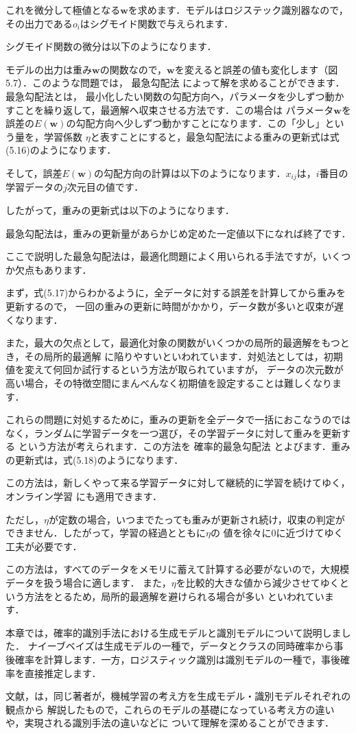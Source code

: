 これを微分して極値となる$\bm{w}$を求めます．モデルはロジステック識別器なので，その出力である$o_i$はシグモイド関数で与えられます．

シグモイド関数の微分は以下のようになります．

モデルの出力は重み$\bm{w}$の関数なので，$\bm{w}$を変えると誤差の値も変化します（図5.7）．このような問題では，
最急勾配法
によって解を求めることができます．最急勾配法とは，
最小化したい関数の勾配方向へ，パラメータを少しずつ動かすことを繰り返して，最適解へ収束させる方法です．この場合は
パラメータ$\bm{w}$を誤差の$E(\bm{w})$の勾配方向へ少しずつ動かすことになります．この「少し」という量を，学習係数
$\eta$と表すことにすると，最急勾配法による重みの更新式は式(5.16)のようになります．


そして，誤差$E(\bm{w})$の勾配方向の計算は以下のようになります．$x_{ij}$は，$i$番目の学習データの$j$次元目の値です．

したがって，重みの更新式は以下のようになります．

最急勾配法は，重みの更新量があらかじめ定めた一定値以下になれば終了です．


ここで説明した最急勾配法は，最適化問題によく用いられる手法ですが，いくつか欠点もあります．

まず，式(5.17)からわかるように，全データに対する誤差を計算してから重みを更新するので，
一回の重みの更新に時間がかかり，データ数が多いと収束が遅くなります．

また，最大の欠点として，最適化対象の関数がいくつかの局所的最適解をもつとき，その局所的最適解
に陥りやすいといわれています．対処法としては，初期値を変えて何回か試行するという方法が取られていますが，
データの次元数が高い場合，その特徴空間にまんべんなく初期値を設定することは難しくなります．

これらの問題に対処するために，重みの更新を全データで一括におこなうのではなく，ランダムに学習データを一つ選び，その学習データに対して重みを更新する
という方法が考えられます．この方法を
確率的最急勾配法
とよびます．重みの更新式は，式(5.18)のようになります．


この方法は，新しくやって来る学習データに対して継続的に学習を続けてゆく，
オンライン学習
にも適用できます．

ただし，$\eta$が定数の場合，いつまでたっても重みが更新され続け，収束の判定ができません．したがって，学習の経過とともに$\eta$の
値を徐々に0に近づけてゆく工夫が必要です．

この方法は，すべてのデータをメモリに蓄えて計算する必要がないので，大規模データを扱う場合に適します．
また，$\eta$を比較的大きな値から減少させてゆくという方法をとるため，局所的最適解を避けられる場合が多い
といわれています．

本章では，確率的識別手法における生成モデルと識別モデルについて説明しました．
ナイーブベイズは生成モデルの一種で，データとクラスの同時確率から事後確率を計算します．一方，ロジスティック識別は識別モデルの一種で，事後確率を直接推定します．

文献\cite{sugiyama09}，\cite{sugiyama13}は，同じ著者が，機械学習の考え方を生成モデル・識別モデルそれぞれの観点から
解説したもので，これらのモデルの基礎になっている考え方の違いや，実現される識別手法の違いなどに
ついて理解を深めることができます．
